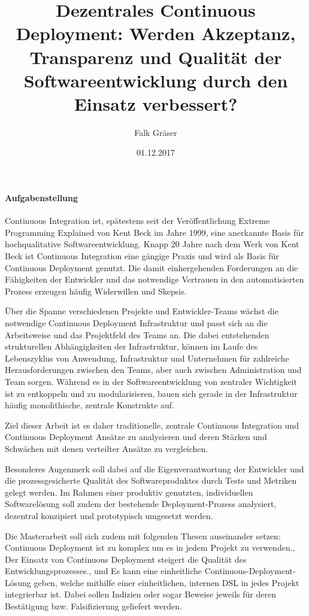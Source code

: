 \documentclass[11pt,english,german]{article}
\begin{document}
\sffamily

\title{\textbf{Dezentrales Continuous Deployment: Werden Akzeptanz, Transparenz und Qualität der Softwareentwicklung durch den Einsatz verbessert?}}
\author{Falk Gräser}
\date{01.12.2017}

\maketitle
{}

\paragraph{\textsf{Aufgabenstellung}}
Continuous Integration ist, spätestens seit der Veröffentlichung \glqq Extreme Programming Explained\grqq{} von Kent Beck im Jahre 1999, eine anerkannte Basis für hochqualitative Softwareentwicklung. Knapp 20 Jahre nach dem Werk von Kent Beck ist Continuous Integration eine gängige Praxis und wird als Basis für Continuous Deployment genutzt. Die damit einhergehenden Forderungen an die Fähigkeiten der Entwickler und das notwendige Vertrauen in den automatisierten Prozess erzeugen häufig Widerwillen und Skepsis.

Über die Spanne verschiedenen Projekte und Entwickler-Teams wächst die notwendige Continuous Deployment Infrastruktur und passt sich an die Arbeitsweise und das Projektfeld des Teams an. Die dabei entstehenden strukturellen Abhängigkeiten der Infrastruktur, können im Laufe des Lebenszyklus von Anwendung, Infrastruktur und Unternehmen für zahlreiche Herausforderungen zwischen den Teams, aber auch zwischen Administration und Team sorgen.
Während es in der Softwareentwicklung von zentraler Wichtigkeit ist zu entkoppeln und zu modularisieren, bauen sich gerade in der Infrastruktur häufig monolithische, zentrale Konstrukte auf.

Ziel dieser Arbeit ist es daher traditionelle, zentrale Continuous Integration und Continuous Deployment Ansätze zu analysieren und deren Stärken und Schwächen mit denen verteilter Ansätze zu vergleichen.

Besonderes Augenmerk soll dabei auf die Eigenverantwortung der Entwickler und die prozessgesicherte Qualität des Softwareproduktes durch Tests und Metriken gelegt werden.
Im Rahmen einer produktiv genutzten, individuellen Softwarelösung soll zudem der bestehende Deployment-Prozess analysiert, dezentral konzipiert und prototypisch umgesetzt werden.

Die Masterarbeit soll sich zudem mit folgenden Thesen auseinander setzen:
\glqq Continuous Deployment ist zu komplex um es in jedem Projekt zu verwenden.\grqq{},
\glqq Der Einsatz von Continuous Deployment steigert die Qualität des Entwicklungsprozesses.\grqq{}, und
\glqq Es kann eine einheitliche Continuous-Deployment-Lösung geben, welche mithilfe einer einheitlichen, internen DSL in jedes Projekt integrierbar ist.\grqq{}
Dabei sollen Indizien oder sogar Beweise jeweils für deren Bestätigung bzw. Falsifizierung geliefert werden.
\end{document}
